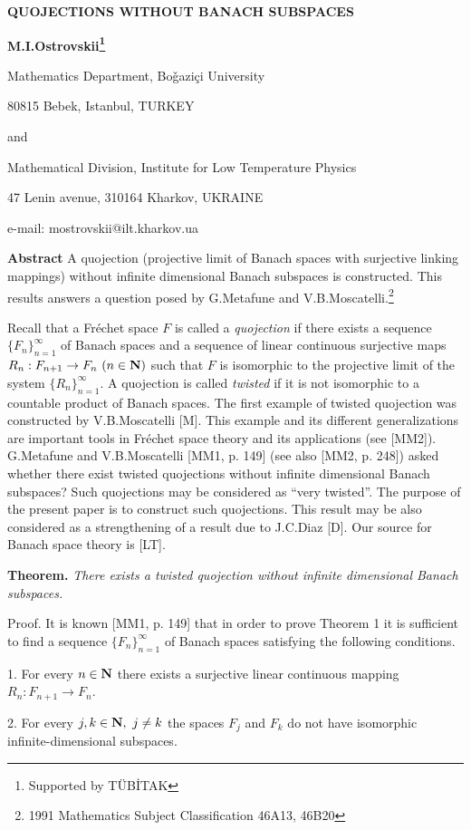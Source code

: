 
\centerline{\bf QUOJECTIONS WITHOUT BANACH SUBSPACES}
\centerline{\bf M.I.Ostrovskii\footnote[1]{Supported by T\"UB\.ITAK}}
\centerline{Mathematics Department, Bo\v gazi\c{c}i University}
\centerline{80815 Bebek, Istanbul, TURKEY}
\centerline{and}
\centerline{Mathematical Division, Institute for Low Temperature Physics}
\centerline{47 Lenin avenue, 310164 Kharkov, UKRAINE}

e-mail: mostrovskii@ilt.kharkov.ua


{\bf Abstract} A quojection (projective limit of Banach spaces
with surjective linking mappings) without infinite dimensional
Banach subspaces is constructed. This results answers a question
posed by G.Metafune and V.B.Moscatelli.\footnote[2]{1991
Mathematics Subject Classification 46A13, 46B20}
\bigskip

Recall that a Fr\'echet space
$F$ is called a {\it quojection} if there exists a sequence
$\{F_n\}_{n=1}^\infty$ of Banach spaces and a sequence of linear
continuous surjective maps $R_n:F_{n+1}\to F_n\ (n\in{\bf N})$ such
that $F$ is isomorphic to the projective limit of the system
$\{R_n\}_{n=1}^\infty$. A
quojection is called {\it twisted} if it is not isomorphic to
a countable product of Banach spaces. The first example of
twisted quojection was constructed by V.B.Moscatelli [M]. This
example and its different generalizations are important tools
in Fr\'echet space theory and its applications (see [MM2]).
G.Metafune and V.B.Moscatelli [MM1, p. 149] (see also [MM2, p. 248])
asked whether there exist twisted quojections without infinite
dimensional Banach subspaces? Such quojections may be considered
as ``very twisted''. The purpose of the present paper is to
construct such quojections. This result may be also considered
as a strengthening of a result due to J.C.Diaz [D].
Our source for Banach space
theory is [LT].

{\bf Theorem.} {\it There exists a twisted quojection without infinite
dimensional Banach subspaces.}

Proof. It is known [MM1, p. 149] that in order to prove Theorem 1
it is sufficient to find a sequence $\{F_n\}_{n=1}^\infty$ of
Banach spaces satisfying the following conditions.

1. For every $n\in{\bf N}$ there exists a surjective linear
continuous mapping $R_n:F_{n+1}\to F_n.$

2. For every $j,k\in{\bf N},\ j\ne k$ the spaces $F_j$ and $F_k$
do not have isomorphic infinite-dimensional subspaces.


